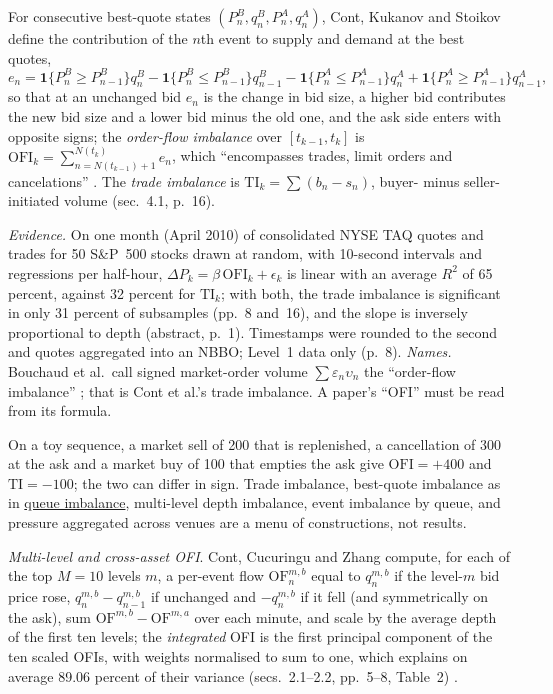 \begin{qfdefinition}\label{def:order-flow-imbalance}
 For consecutive best-quote states $(P^B_n,q^B_n,P^A_n,q^A_n)$, Cont, Kukanov and Stoikov define the contribution of the $n$th event to supply and demand at the best quotes,
\[ e_n=\mathbf 1\{P^B_n\ge P^B_{n-1}\}q^B_n-\mathbf 1\{P^B_n\le P^B_{n-1}\}q^B_{n-1}-\mathbf 1\{P^A_n\le P^A_{n-1}\}q^A_n+\mathbf 1\{P^A_n\ge P^A_{n-1}\}q^A_{n-1}, \]
so that at an unchanged bid $e_n$ is the change in bid size, a higher bid contributes the new bid size and a lower bid minus the old one, and the ask side enters with opposite signs; the \emph{order-flow imbalance} over $[t_{k-1},t_k]$ is $\mathrm{OFI}_k=\sum_{n=N(t_{k-1})+1}^{N(t_k)}e_n$, which ``encompasses trades, limit orders and cancelations'' \citep[arXiv v3, sec.~2.1, p.~4]{catalogue-0503}. The \emph{trade imbalance} is $\mathrm{TI}_k=\sum(b_n-s_n)$, buyer- minus seller-initiated volume (sec.~4.1, p.~16).

 \emph{Evidence.} On one month (April 2010) of consolidated NYSE TAQ quotes and trades for 50 S\&P~500 stocks drawn at random, with 10-second intervals and regressions per half-hour, $\Delta P_k=\beta\,\mathrm{OFI}_k+\epsilon_k$ is linear with an average $R^2$ of 65 percent, against 32 percent for $\mathrm{TI}_k$; with both, the trade imbalance is significant in only 31 percent of subsamples (pp.~8 and~16), and the slope is inversely proportional to depth (abstract, p.~1). Timestamps were rounded to the second and quotes aggregated into an NBBO; Level~1 data only (p.~8). \emph{Names.} Bouchaud et al.\ call signed market-order volume $\sum\varepsilon_n\upsilon_n$ the ``order-flow imbalance'' \citep[chap.~11, sec.~11.4, p.~222]{catalogue-0528}; that is Cont et al.'s trade imbalance. A paper's ``OFI'' must be read from its formula.

 On a toy sequence, a market sell of 200 that is replenished, a cancellation of 300 at the ask and a market buy of 100 that empties the ask give $\mathrm{OFI}=+400$ and $\mathrm{TI}=-100$; the two can differ in sign. Trade imbalance, best-quote imbalance as in \hyperref[def:queue-imbalance]{queue imbalance}, multi-level depth imbalance, event imbalance by queue, and pressure aggregated across venues are a menu of constructions, not results.

\emph{Multi-level and cross-asset OFI}. Cont, Cucuringu and Zhang compute, for each of the top $M=10$ levels $m$, a per-event flow $\mathrm{OF}^{m,b}_n$ equal to $q^{m,b}_n$ if the level-$m$ bid price rose, $q^{m,b}_n-q^{m,b}_{n-1}$ if unchanged and $-q^{m,b}_n$ if it fell (and symmetrically on the ask), sum $\mathrm{OF}^{m,b}-\mathrm{OF}^{m,a}$ over each minute, and scale by the average depth of the first ten levels; the \emph{integrated} OFI is the first principal component of the ten scaled OFIs, with weights normalised to sum to one, which explains on average 89.06 percent of their variance (secs.~2.1--2.2, pp.~5--8, Table~2) \citep[arXiv v4, 13 June 2023]{wide-cont-cross-impact-ofi}.


\end{qfdefinition}
